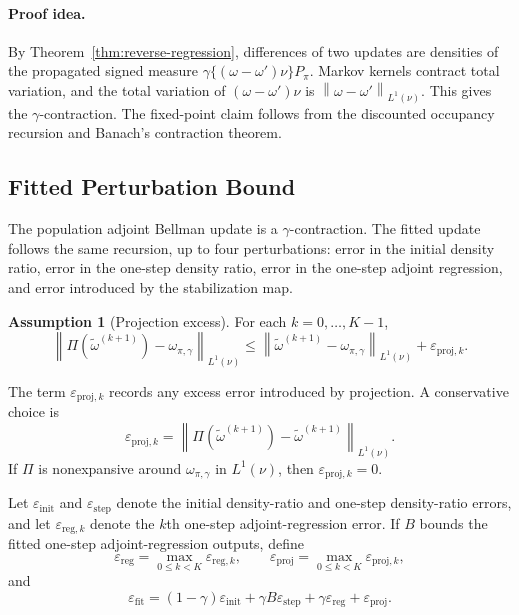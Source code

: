 \documentclass{article}
\newcommand{\1}{\mathbf{1}}
\newcommand{\omegastar}{\omega_{\pi,\gamma}}
\newcommand{\Ppi}{P_\pi}
\newcommand{\omegatilde}{\widetilde{\omega}}
\newcommand{\Proj}{\Pi}
\newcommand{\norm}[2][]{\left\lVert #2 \right\rVert_{#1}}
\newcommand{\LoneNu}[1]{\norm[L^1(\nu)]{#1}}
\theoremstyle{plain}
\theoremstyle{definition}
\newtheorem{assumption}[theorem]{Assumption}
\theoremstyle{remark}
\begin{document}
\paragraph{Proof idea.}
By Theorem~\ref{thm:reverse-regression}, differences of two updates are densities of
the propagated signed measure $\gamma\{(\omega-\omega')\nu\}\Ppi$. Markov
kernels contract total variation, and the total variation of
$(\omega-\omega')\nu$ is $\LoneNu{\omega-\omega'}$. This gives the
$\gamma$-contraction. The fixed-point claim follows from the discounted
occupancy recursion and Banach's contraction theorem.


\subsection{Fitted Perturbation Bound}

The population adjoint Bellman update is a $\gamma$-contraction. The fitted
update follows the same recursion, up to four perturbations: error in the
initial density ratio, error in the one-step density ratio, error in the one-step adjoint regression,
and error introduced by the stabilization map.

\begin{assumption}[Projection excess]
\label{ass:projection-error}
For each $k=0,\ldots,K-1$,
\[
    \LoneNu{\Proj(\omegatilde^{(k+1)})-\omegastar}
    \leq
    \LoneNu{\omegatilde^{(k+1)}-\omegastar}
    +
    \varepsilon_{\mathrm{proj},k}.
\]
\end{assumption}

The term $\varepsilon_{\mathrm{proj},k}$ records any excess error introduced by
projection. A conservative choice is
\[
    \varepsilon_{\mathrm{proj},k}
    =
    \LoneNu{\Proj(\omegatilde^{(k+1)})-\omegatilde^{(k+1)}}.
\]
If $\Proj$ is nonexpansive around $\omegastar$ in $L^1(\nu)$, then
$\varepsilon_{\mathrm{proj},k}=0$.

Let $\varepsilon_{\mathrm{init}}$ and $\varepsilon_{\mathrm{step}}$ denote the
initial density-ratio and one-step density-ratio errors, and let $\varepsilon_{\mathrm{reg},k}$
denote the $k$th one-step adjoint-regression error. If $B$ bounds the fitted
one-step adjoint-regression outputs, define
\[
    \varepsilon_{\mathrm{reg}}
    =
    \max_{0\le k<K}\varepsilon_{\mathrm{reg},k},
    \qquad
    \varepsilon_{\mathrm{proj}}
    =
    \max_{0\le k<K}\varepsilon_{\mathrm{proj},k},
\]
and
\[
    \varepsilon_{\mathrm{fit}}
    =
    (1-\gamma)\varepsilon_{\mathrm{init}}
    +
    \gamma B\varepsilon_{\mathrm{step}}
    +
    \gamma\varepsilon_{\mathrm{reg}}
    +
    \varepsilon_{\mathrm{proj}}.
\]
\end{document}
